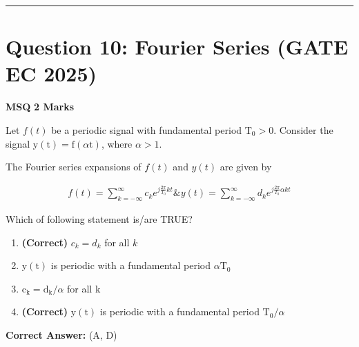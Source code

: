 \documentclass[11pt,a4paper]{article}
\begin{document}
\vspace{1.5em}
\hrule
\vspace{1.5em}

\section*{Question 10: Fourier Series (GATE EC 2025)}
\noindent \textbf{\color{primary}MSQ} \hfill \textbf{\color{secondary}2 Marks}


\noindent Let $f(t)$ be a periodic signal with fundamental period $\mathrm{T}_{0}>0$. Consider the signal $\mathrm{y}(\mathrm{t})=\mathrm{f}(\alpha \mathrm{t})$, where $\alpha>1$. 

The Fourier series expansions of $f(t)$ and $y(t)$ are given by

\[
\begin{aligned}
f(t)=\sum_{k=-\infty}^{\infty} c_{k} e^{j \frac{2 \pi}{T_{0}} k t} \& y(t)=\sum_{k=-\infty}^{\infty} d_{k} e^{j \frac{2 \pi}{T_{0}} \alpha k t}
\end{aligned}
\]

Which of following statement is/are TRUE?


\begin{enumerate}[label=(\Alph*)]
    \item \textbf{(Correct)} $c_{k}=d_{k}$ for all $k$
    \item $\mathrm{y}(\mathrm{t})$ is periodic with a fundamental period $\alpha \mathrm{T}_{0}$
    \item $\mathrm{c}_{\mathrm{k}}=\mathrm{d}_{\mathrm{k}} / \alpha$ for all k
    \item \textbf{(Correct)} $\mathrm{y}(\mathrm{t})$ is periodic with a fundamental period $\mathrm{T}_{0} / \alpha$
\end{enumerate}

\noindent \textbf{Correct Answer:} (A, D)
\end{document}
